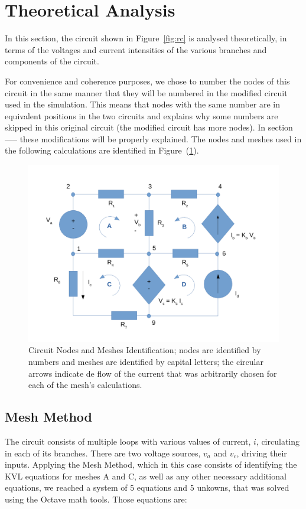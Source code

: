 \section{Theoretical Analysis}
\label{sec:analysis}

In this section, the circuit shown in Figure~\ref{fig:rc} is analysed
theoretically, in terms of the voltages and current intensities of the various branches and components of the circuit.

For convenience and coherence purposes, we chose to number the nodes of this circuit in the same manner that they will be numbered in the modified circuit used in the simulation. This means that nodes with the same number are in equivalent positions in the two circuits and explains why some numbers are skipped in this original circuit (the modified circuit has more nodes). In section ----- these modifications will be properly explained.
The nodes and meshes used in the following calculations are identified in Figure~(\ref{fig:circuit_analysis}).

\begin{figure}[h] \centering
\includegraphics[width=0.8\linewidth]{circuit_analysis.pdf}
\caption{Circuit Nodes and Meshes Identification; nodes are identified by numbers and meshes are identified by capital letters; the circular arrows indicate de flow of the current that was arbitrarily chosen for each of the mesh's calculations.}
\label{fig:circuit_analysis}
\end{figure}


\subsection{Mesh Method}

The circuit consists of multiple loops with various values of current, $i$, circulating in each of its branches. There are two
voltage sources, $v_a$ and $v_c$, driving their inputs. Applying the Mesh Method, which in this case consists of identifying the KVL equations for meshes A and C, as well as any other necessary additional equations, we reached a system of 5 equations and 5 unkowns, that was solved using the Octave math tools. Those equations are:

